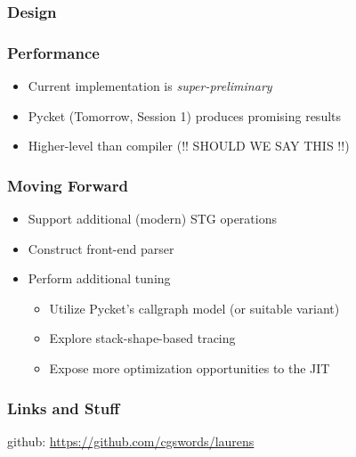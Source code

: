\documentclass[xetex,serif,mathserif]{beamer}
\newenvironment{slide}[1]{\begin{frame}\frametitle{#1}}{\end{frame}}
\begin{document}
\begin{slide}{Design}
\end{slide}

\begin{slide}{Performance}
  \begin{itemize}
    \item Current implementation is \emph{super-preliminary}
    \item Pycket (Tomorrow, Session 1) produces promising results
    \item Higher-level than compiler  (!! SHOULD WE SAY THIS !!)
  \end{itemize}
\end{slide}

\begin{slide}{Moving Forward}
  \begin{itemize}
    \item Support additional (modern) STG operations
    \item Construct front-end parser
    \item Perform additional tuning
    \begin{itemize}
      \item Utilize Pycket's callgraph model (or suitable variant)
      \item Explore stack-shape-based tracing
      \item Expose more optimization opportunities to the JIT
    \end{itemize}
  \end{itemize}
\end{slide}

\begin{slide}{Links and Stuff}
    \begin{center}
        github: \href{https://github.com/cgswords/laurens}{https://github.com/cgswords/laurens}
    \end{center}
\end{slide}
\end{document}
